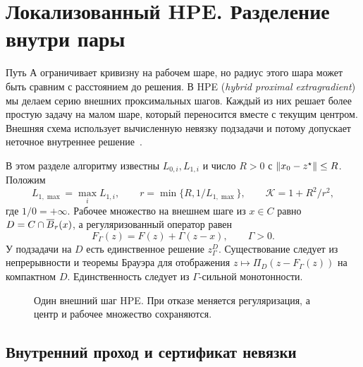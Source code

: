 \section{Локализованный HPE. Разделение внутри пары}\label{sec:hpe}

Путь А ограничивает кривизну на рабочем шаре, но радиус этого шара
может быть сравним с расстоянием до решения. В HPE
(\emph{hybrid proximal extragradient}) мы делаем серию внешних
проксимальных шагов. Каждый из них решает более простую задачу
на малом шаре, который переносится вместе с текущим центром.
Внешняя схема использует вычисленную невязку подзадачи и потому
допускает неточное внутреннее решение~\cite{monteiro}.

В этом разделе алгоритму известны $L_{0,i},L_{1,i}$ и число $R>0$
с $\lVert x_0-z^\star\rVert\le R$. Положим
\[
 L_{1,\max}=\max_i L_{1,i},\qquad
 r=\min\{R,1/L_{1,\max}\},\qquad
 \mathcal K=1+R^2/r^2,
\]
где $1/0=+\infty$. Рабочее множество на внешнем шаге из $x\in C$
равно $D=C\cap\overline B_r(x)$, а регуляризованный оператор равен
\[
 F_\Gamma(z)=F(z)+\Gamma(z-x),\qquad \Gamma>0.
\]
У подзадачи на $D$ есть единственное решение $z_\Gamma^D$.
Существование следует из непрерывности и теоремы Брауэра для
отображения $z\mapsto \Pi_D(z-F_\Gamma(z))$ на компактном $D$.
Единственность следует из $\Gamma$-сильной монотонности.

\begin{figure}[htbp]
\centering
{}
\caption{Один внешний шаг HPE. При отказе меняется регуляризация,
а центр и рабочее множество сохраняются.}\label{fig:hpe-composition}
\end{figure}

\subsection{Внутренний проход и сертификат невязки}

